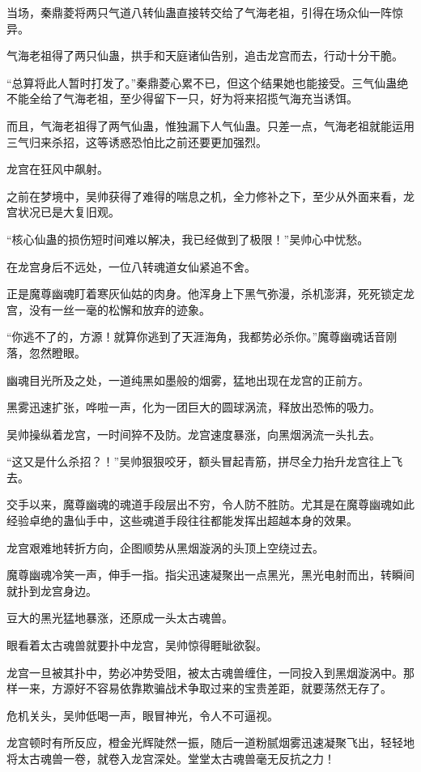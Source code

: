 \begin{this_body}
当场，秦鼎菱将两只气道八转仙蛊直接转交给了气海老祖，引得在场众仙一阵惊异。

气海老祖得了两只仙蛊，拱手和天庭诸仙告别，追击龙宫而去，行动十分干脆。

“总算将此人暂时打发了。”秦鼎菱心累不已，但这个结果她也能接受。三气仙蛊绝不能全给了气海老祖，至少得留下一只，好为将来招揽气海充当诱饵。

而且，气海老祖得了两气仙蛊，惟独漏下人气仙蛊。只差一点，气海老祖就能运用三气归来杀招，这等诱惑恐怕比之前还要更加强烈。

龙宫在狂风中飙射。

之前在梦境中，吴帅获得了难得的喘息之机，全力修补之下，至少从外面来看，龙宫状况已是大复旧观。

“核心仙蛊的损伤短时间难以解决，我已经做到了极限！”吴帅心中忧愁。

在龙宫身后不远处，一位八转魂道女仙紧追不舍。

正是魔尊幽魂盯着寒灰仙姑的肉身。他浑身上下黑气弥漫，杀机澎湃，死死锁定龙宫，没有一丝一毫的松懈和放弃的迹象。

“你逃不了的，方源！就算你逃到了天涯海角，我都势必杀你。”魔尊幽魂话音刚落，忽然瞪眼。

幽魂目光所及之处，一道纯黑如墨般的烟雾，猛地出现在龙宫的正前方。

黑雾迅速扩张，哗啦一声，化为一团巨大的圆球涡流，释放出恐怖的吸力。

吴帅操纵着龙宫，一时间猝不及防。龙宫速度暴涨，向黑烟涡流一头扎去。

“这又是什么杀招？！”吴帅狠狠咬牙，额头冒起青筋，拼尽全力抬升龙宫往上飞去。

交手以来，魔尊幽魂的魂道手段层出不穷，令人防不胜防。尤其是在魔尊幽魂如此经验卓绝的蛊仙手中，这些魂道手段往往都能发挥出超越本身的效果。

龙宫艰难地转折方向，企图顺势从黑烟漩涡的头顶上空绕过去。

魔尊幽魂冷笑一声，伸手一指。指尖迅速凝聚出一点黑光，黑光电射而出，转瞬间就扑到龙宫身边。

豆大的黑光猛地暴涨，还原成一头太古魂兽。

眼看着太古魂兽就要扑中龙宫，吴帅惊得睚眦欲裂。

龙宫一旦被其扑中，势必冲势受阻，被太古魂兽缠住，一同投入到黑烟漩涡中。那样一来，方源好不容易依靠欺骗战术争取过来的宝贵差距，就要荡然无存了。

危机关头，吴帅低喝一声，眼冒神光，令人不可逼视。

龙宫顿时有所反应，橙金光辉陡然一振，随后一道粉腻烟雾迅速凝聚飞出，轻轻地将太古魂兽一卷，就卷入龙宫深处。堂堂太古魂兽毫无反抗之力！


\end{this_body}

